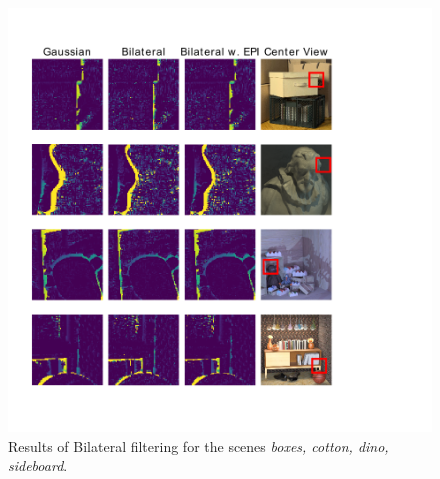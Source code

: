 \documentclass  [
  paper    = a4,
  BCOR     = 10mm,
  twoside,
  fontsize = 12pt,
  fleqn,
  toc      = bibnumbered,
  toc      = listofnumbered,
  numbers  = noendperiod,
  headings = normal,
  listof   = leveldown,
  version  = 3.03
]                                       {scrreprt}
\begin{document}
\begin{figure}
	\centering
	\includegraphics[width=1\linewidth]{images/bilat_results}
	\caption[Results of the bilateral filtering]{Results of Bilateral filtering for the scenes \textit{ boxes, cotton, dino, sideboard}.}
	\label{fig:bilatresults}
\end{figure}
\end{document}
